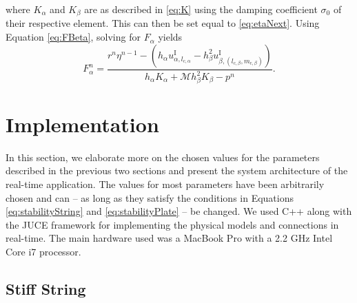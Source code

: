 where $K_\alpha$ and $K_\beta$ are as described in \eqref{eq:K} using the damping coefficient $\sigma_0$ of their respective element. This can then be set equal to \eqref{eq:etaNext}. Using Equation \eqref{eq:FBeta}, solving for $F_\alpha$ yields
\begin{equation}
    F_\alpha^n = \frac{r^n\eta^{n-1}-(h_\alpha u_{\alpha, l_{\text{c},\alpha}}^\text{I} - h^2_\beta u_{\beta,(l_{\text{c},\beta},m_{\text{c},\beta})}^\text{I})}{h_\alpha K_\alpha + \mathcal{M}h^2_\beta K_\beta-p^n}.
\end{equation}

\section{Implementation}\label{sec:implementation}
In this section, we elaborate more on the chosen values for the parameters described in the previous two sections and present the system architecture of the real-time application. The values for most parameters have been arbitrarily chosen and can -- as long as they satisfy the conditions in Equations \eqref{eq:stabilityString} and \eqref{eq:stabilityPlate} -- be changed. We used C++ along with the JUCE framework \cite{JUCE2019} for implementing the physical models and connections in real-time. The main hardware used was a MacBook Pro with a 2.2 GHz Intel Core i7 processor.

\subsection{Stiff String}

